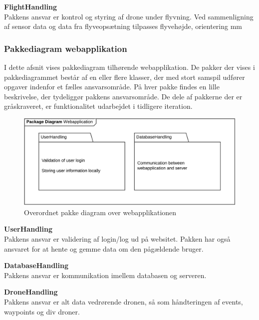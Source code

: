 \textbf{FlightHandling}\\
Pakkens ansvar er kontrol og styring af drone under flyvning. Ved sammenligning af sensor data og data fra flyveopsætning tilpasses flyvehøjde, orientering mm



\newpage
\subsubsection*{Pakkediagram webapplikation}

I dette afsnit vises pakkediagram tilhørende webapplikation. De pakker der vises i pakkediagrammet består af en eller flere klasser, der med stort samspil udfører opgaver indenfor et fælles ansvarsområde. På hver pakke findes en lille beskrivelse, der tydeliggør pakkens ansvarsområde. De dele af pakkerne der er gråskraveret, er funktionalitet udarbejdet i tidligere iteration.

\begin{figure}[H]
	\centering
	\includegraphics[width=1\textwidth]{Billeder/pakke_diagrammer/iteration1_server.png}
	\vspace{-0.5cm}
	\caption{Overordnet pakke diagram over webapplikationen}
	\label{fig:iteration1_pakke_diagram_webapp}
\end{figure}

\textbf{UserHandling}\\
Pakkens ansvar er validering af login/log ud på websitet. Pakken har også ansvaret for at hente og gemme data om den pågældende bruger.

\textbf{DatabaseHandling}\\
Pakkens ansvar er kommunikation imellem databasen og serveren. 

\textbf{DroneHandling}\\
Pakkens ansvar er alt data vedrørende dronen, så som håndteringen af events, waypoints og div droner.

\newpage

